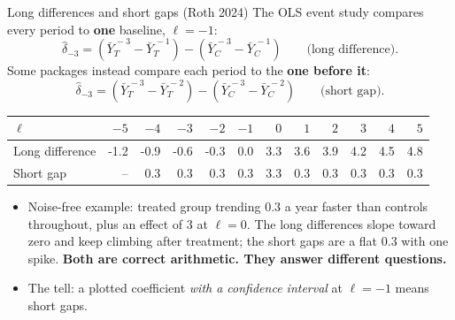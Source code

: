 \documentclass[
  11pt,
  ignorenonframetext,
  aspectratio=169,
]{beamer}
\providecommand{\tightlist}{%
  \setlength{\itemsep}{0pt}\setlength{\parskip}{0pt}}
\begin{document}
\begin{frame}{Long differences and short gaps (Roth 2024)}
\protect{}\label{long-differences-and-short-gaps-roth-2024}
The OLS event study compares every period to \textbf{one} baseline,
\(\ell = -1\): \[
\hat\delta_{-3} = (\bar Y_T^{\,-3} - \bar Y_T^{\,-1}) - (\bar Y_C^{\,-3} - \bar Y_C^{\,-1}) \qquad\text{(long difference)}.
\] Some packages instead compare each period to the \textbf{one before
it}: \[
\hat\delta_{-3} = (\bar Y_T^{\,-3} - \bar Y_T^{\,-2}) - (\bar Y_C^{\,-3} - \bar Y_C^{\,-2}) \qquad\text{(short gap)}.
\]

\begin{center}\small
\begin{tabular}{lrrrrrrrrrrr}
\toprule
$\ell$ & $-5$ & $-4$ & $-3$ & $-2$ & $-1$ & $0$ & $1$ & $2$ & $3$ & $4$ & $5$ \\
\midrule
Long difference & -1.2 & -0.9 & -0.6 & -0.3 & 0.0 & 3.3 & 3.6 & 3.9 & 4.2 & 4.5 & 4.8 \\
Short gap & -- & 0.3 & 0.3 & 0.3 & 0.3 & 3.3 & 0.3 & 0.3 & 0.3 & 0.3 & 0.3 \\
\bottomrule
\end{tabular}
\end{center}

\begin{itemize}
\tightlist
\item
  Noise-free example: treated group trending \(0.3\) a year faster than
  controls throughout, plus an effect of \(3\) at \(\ell = 0\). The long
  differences slope toward zero and keep climbing after treatment; the
  short gaps are a flat \(0.3\) with one spike. \textbf{Both are correct
  arithmetic. They answer different questions.}
\item
  The tell: a plotted coefficient \emph{with a confidence interval} at
  \(\ell = -1\) means short gaps.
\end{itemize}
\end{frame}
\end{document}
